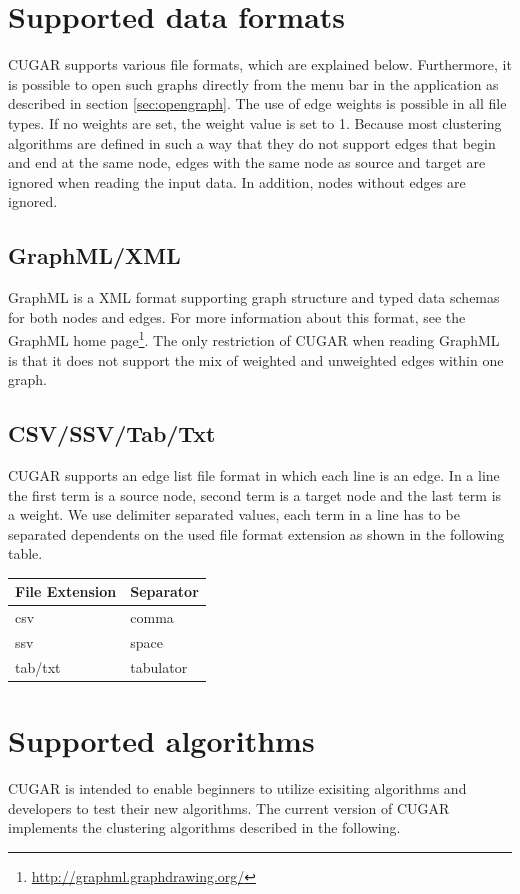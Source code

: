 \documentclass[a4paper, 11pt]{article}
\begin{document}
\section{Supported data formats} \label{sec:files}
	CUGAR supports various file formats, which are explained below. 
	Furthermore, it is possible to open such graphs directly from the menu bar in the application as described in section \ref{sec:opengraph}. 
	The use of edge weights is possible in all file types. If no weights are set, the weight value is set to 1. 
	Because most clustering algorithms are defined in such a way that they do not support edges that begin and end at the same node, 
	edges with the same node as source and target are ignored when reading the input data. In addition, nodes without edges are ignored.

	\subsection{GraphML/XML}
		GraphML is a XML format supporting graph structure and typed data schemas for both nodes and edges.
		For more information about this format, see the GraphML home page\footnote{\url{http://graphml.graphdrawing.org/}}. 
		The only restriction of CUGAR when reading GraphML is that it does not support the mix of weighted and unweighted edges within one graph. 

	\subsection{CSV/SSV/Tab/Txt} \label{sec:delimiterFiles}
		CUGAR supports an edge list file format in which each line is an edge. 
		In a line the first term is a source node, second term is a target node and the last term is a weight. 
		We use delimiter separated values, each term in a line has to be separated dependents
		on the used file format extension as shown in the following table.

	\begin{center}
		\begin{tabular}[ht]{|l|l|}
		\hline
		File Extension & Separator\\
		\hline
		csv & comma \\
		ssv & space\\
		tab/txt & tabulator \\
		\hline
		\end{tabular}
	\end{center}

\newpage
\section{Supported algorithms} \label{sec:algo}
	CUGAR is intended to enable beginners to utilize exisiting algorithms and developers to test their new algorithms. 
	The current version of CUGAR implements the clustering algorithms described in the following.
\end{document}
